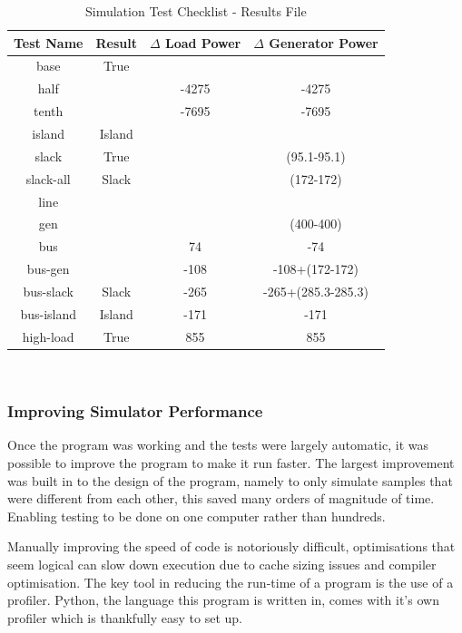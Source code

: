 \documentclass[a4paper,oneside,12pt]{report}
\begin{document}
\begin{table}[htbp]
\caption{Simulation Test Checklist - Results File}
\label{table_sim_test_b}
\centering
\begin{tabular}{c||c||c||c}
\bfseries Test Name & \bfseries Result & \bfseries $\Delta$ Load Power & \bfseries $\Delta$ Generator Power \\
\hline \hline
base      & True  &             & \\
half      &       & -4275       & -4275 \\
tenth     &       & -7695       & -7695 \\
island    & Island&             & \\
slack     & True  &             & (95.1-95.1) \\
slack-all & Slack &             & (172-172) \\
line      &       &             & \\
gen       &       &             & (400-400) \\
bus       &       & 74          & -74 \\
bus-gen   &       & -108        & -108+(172-172) \\
bus-slack & Slack & -265        & -265+(285.3-285.3) \\
bus-island& Island& -171        & -171 \\
high-load & True  & 855         & 855 \\
\hline
\end{tabular}\\
\end{table}

\subsubsection{Improving Simulator Performance}

Once the program was working and the tests were largely automatic, it
was possible to improve the program to make it run faster. The largest
improvement was built in to the design of the program, namely to only
simulate samples that were different from each other, this saved many
orders of magnitude of time. Enabling testing to be done on one computer
rather than hundreds.

Manually improving the speed of code is notoriously difficult,
optimisations that seem logical can slow down execution due to cache
sizing issues and compiler optimisation. The key tool in reducing the
run-time of a program is the use of a profiler. Python, the language
this program is written in, comes with it's own profiler which is
thankfully easy to set up.
\end{document}
